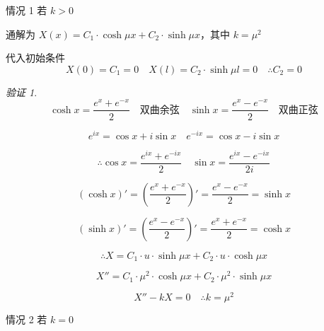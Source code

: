 \documentclass[12pt,a4paper]{article}
\numberwithin{subsection}{section}   %
\numberwithin{subsubsection}{subsection}
\theoremstyle{plain}
\theoremstyle{definition}
\theoremstyle{remark}
\theoremstyle{remark}
\newtheorem{verification}[theorem]{验证}
\begin{document}
情况 1 \quad 若 \(k > 0\)

通解为 \(X(x) = C_1 \cdot \cosh \mu x + C_2 \cdot \sinh \mu x\)，其中 \(k = \mu^2\)
	
	代入初始条件 
	\begin{equation}
		X(0) = C_1 = 0 \quad X(l) = C_2 \cdot \sinh \mu l = 0 \quad \therefore C_2 = 0
	\end{equation}
	
	
	\begin{verification}	
		\begin{equation*}
			\cosh x = \frac{e^x + e^{-x}}{2} \quad \text{双曲余弦} \quad \sinh x = \frac{e^x - e^{-x}}{2} \quad \text{双曲正弦}
		\end{equation*}
		
		\begin{equation*}
			e^{ix} = \cos x + i \sin x \quad e^{-ix} = \cos x - i \sin x
		\end{equation*}
		
		\begin{equation*}
			\therefore \cos x = \frac{e^{ix} + e^{-ix}}{2} \quad \sin x = \frac{e^{ix} - e^{-ix}}{2i}
		\end{equation*}
		
		\begin{equation*}
			(\cosh x)' = \left( \frac{e^x + e^{-x}}{2} \right)' = \frac{e^x - e^{-x}}{2} = \sinh x
		\end{equation*}
		
		\begin{equation*}
			(\sinh x)' = \left( \frac{e^x - e^{-x}}{2} \right)' = \frac{e^x + e^{-x}}{2} = \cosh x
		\end{equation*}
		
		\begin{equation*}
			\therefore X = C_1 \cdot u \cdot \sinh \mu x + C_2 \cdot u \cdot \cosh \mu x
		\end{equation*}
		
		\begin{equation*}
			X'' = C_1 \cdot \mu^2 \cdot \cosh \mu x + C_2 \cdot \mu^2 \cdot \sinh \mu x
		\end{equation*}
		
		\begin{equation*}
			X'' - kX = 0 \quad \therefore k = \mu^2
		\end{equation*}
		
	\end{verification}	
	
	
情况 2 \quad 若 \(k = 0\)
\end{document}
